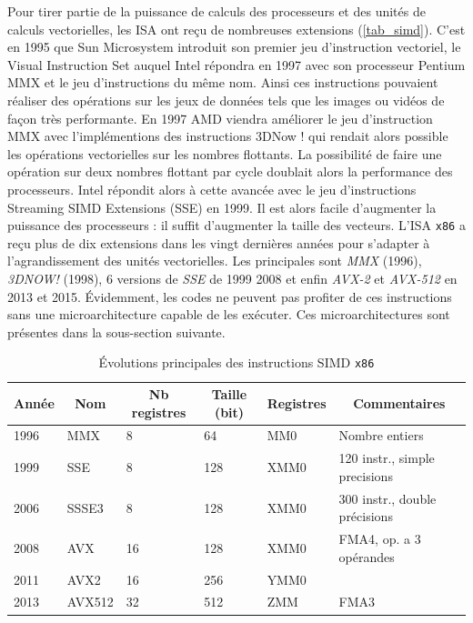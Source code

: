             Pour tirer partie de la puissance de calculs des processeurs et des unités de calculs vectorielles, les ISA ont reçu de nombreuses extensions (\autoref{tab_simd}).
            C'est en 1995 que Sun Microsystem introduit son premier jeu d'instruction vectoriel, le Visual Instruction Set auquel Intel répondra en 1997 avec son processeur Pentium MMX et le jeu d'instructions du même nom. Ainsi ces instructions pouvaient réaliser des opérations sur les jeux de données tels que les images ou vidéos de façon très performante. En 1997 AMD viendra améliorer le jeu d'instruction MMX avec l'implémentions des instructions 3DNow ! qui rendait alors possible les opérations vectorielles sur les nombres flottants. La possibilité de faire une opération sur deux nombres flottant par cycle doublait alors la performance des processeurs. Intel répondit alors à cette avancée avec le jeu d'instructions Streaming SIMD Extensions (SSE) en 1999. Il est alors facile d'augmenter la puissance des processeurs : il suffit d'augmenter la taille des vecteurs.
            L'ISA \verb|x86| a reçu plus de dix extensions dans les vingt dernières années pour s'adapter à l'agrandissement des unités vectorielles. Les principales sont \textit{MMX} (1996), \textit{3DNOW!} (1998), 6 versions de \textit{SSE} de 1999 2008 et enfin \textit{AVX-2} et \textit{AVX-512} en 2013 et 2015. Évidemment, les codes ne peuvent pas profiter de ces instructions sans une microarchitecture capable de les exécuter. Ces microarchitectures sont présentes dans la sous-section suivante. 
        
                \begin{table}[]
                \centering
                \begin{tabular}{|l|l|l|l|l|l|}
                \hline
                \multicolumn{1}{|c|}{Année} & \multicolumn{1}{c|}{Nom} & \multicolumn{1}{c|}{Nb registres} & \multicolumn{1}{c|}{Taille (bit)} & \multicolumn{1}{c|}{Registres} & \multicolumn{1}{c|}{Commentaires} \\ \hline
                1996 & MMX & 8 & 64 & MM0 & Nombre entiers \\ \hline
                1999 & SSE & 8 & 128 & XMM0 & 120 instr., simple precisions \\ \hline
                2006 & SSSE3 & 8 & 128 & XMM0 & 300 instr., double précisions \\ \hline
                2008 & AVX & 16 & 128 & XMM0 & FMA4, op. a 3 opérandes \\ \hline
                2011 & AVX2 & 16 & 256 & YMM0 &  \\ \hline
                2013 & AVX512 & 32 & 512 & ZMM & FMA3 \\ \hline
                \end{tabular}%
                \caption{Évolutions principales des instructions SIMD \texttt{x86}}
                \label{tab_simd}
                \end{table}

